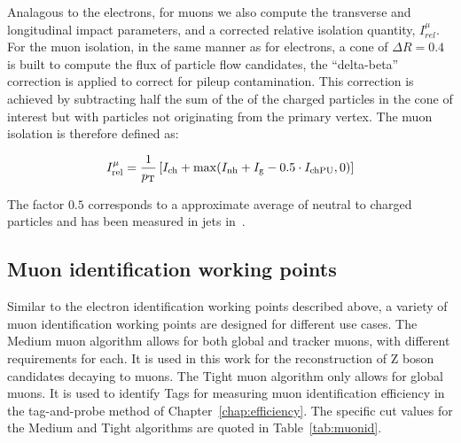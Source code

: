 Analagous to the electrons, for muons we also compute the transverse and longitudinal impact parameters,
and a corrected relative isolation quantity, $I_{rel}^{\mu}$.
For the muon isolation, in the same manner as for electrons, a cone of $\Delta R = 0.4$ is built to compute the flux of particle flow candidates,
the ``delta-beta'' correction is applied to correct for pileup contamination. This correction is achieved by
subtracting half the sum of the \pt of the charged particles in the cone of interest but with particles not originating from the primary vertex.
The muon isolation is therefore defined as:

\begin{equation}
I^{\mu}_{\rm rel}=\frac{1}{p_{\rm T}}  \left[ I_{\rm ch}+\max(I_{\rm nh}+I_{\rm g}-0.5\cdot I_{\rm chPU} ,0) \right]
\label{eq:muisol}
\end{equation}

The factor $0.5$ corresponds to a approximate average of neutral to charged particles and has been measured in jets in~\cite{CMS-PAS-PFT-10-002}.

\subsection{Muon identification working points}
Similar to the electron identification working points described above,
a variety of muon identification working points are designed for different use cases.
The Medium muon algorithm allows for both global and tracker muons, with different requirements for each.
It is used in this work for the reconstruction of Z boson candidates decaying to muons.
The Tight muon algorithm only allows for global muons.
It is used to identify Tags for measuring muon identification efficiency in the tag-and-probe method of Chapter~\ref{chap:efficiency}.
The specific cut values for the Medium and Tight algorithms are quoted in Table~\ref{tab:muonid}.

